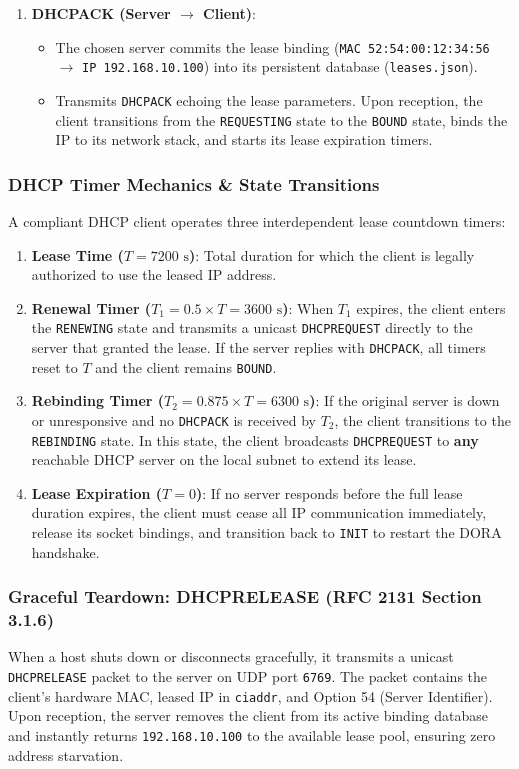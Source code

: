 \documentclass[12pt, a4paper]{article}
\begin{document}
\begin{enumerate}
    \item \textbf{DHCPACK (Server $\to$ Client)}:
    \begin{itemize}
        \item The chosen server commits the lease binding (\texttt{MAC 52:54:00:12:34:56} $\to$ \texttt{IP 192.168.10.100}) into its persistent database (\texttt{leases.json}).
        \item Transmits \texttt{DHCPACK} echoing the lease parameters. Upon reception, the client transitions from the \texttt{REQUESTING} state to the \texttt{BOUND} state, binds the IP to its network stack, and starts its lease expiration timers.
    \end{itemize}
\end{enumerate}

\subsubsection{DHCP Timer Mechanics \& State Transitions}
A compliant DHCP client operates three interdependent lease countdown timers:
\begin{enumerate}
    \item \textbf{Lease Time ($T = 7200\text{ s}$)}: Total duration for which the client is legally authorized to use the leased IP address.
    \item \textbf{Renewal Timer ($T_1 = 0.5 \times T = 3600\text{ s}$)}: When $T_1$ expires, the client enters the \texttt{RENEWING} state and transmits a unicast \texttt{DHCPREQUEST} directly to the server that granted the lease. If the server replies with \texttt{DHCPACK}, all timers reset to $T$ and the client remains \texttt{BOUND}.
    \item \textbf{Rebinding Timer ($T_2 = 0.875 \times T = 6300\text{ s}$)}: If the original server is down or unresponsive and no \texttt{DHCPACK} is received by $T_2$, the client transitions to the \texttt{REBINDING} state. In this state, the client broadcasts \texttt{DHCPREQUEST} to \textbf{any} reachable DHCP server on the local subnet to extend its lease.
    \item \textbf{Lease Expiration ($T = 0$)}: If no server responds before the full lease duration expires, the client must cease all IP communication immediately, release its socket bindings, and transition back to \texttt{INIT} to restart the DORA handshake.
\end{enumerate}

\subsubsection{Graceful Teardown: DHCPRELEASE (RFC 2131 Section 3.1.6)}
When a host shuts down or disconnects gracefully, it transmits a unicast \texttt{DHCPRELEASE} packet to the server on UDP port \texttt{6769}. The packet contains the client's hardware MAC, leased IP in \texttt{ciaddr}, and Option 54 (Server Identifier). Upon reception, the server removes the client from its active binding database and instantly returns \texttt{192.168.10.100} to the available lease pool, ensuring zero address starvation.
\end{document}
